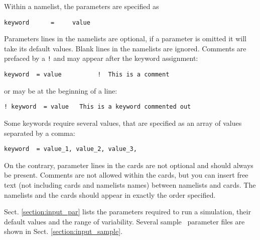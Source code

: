 Within a namelist, the parameters are specified as
\begin{verbatim}
keyword      =     value
\end{verbatim}
Parameters lines in the namelists are optional, if a parameter is omitted
it will take its default values.
Blank lines in the namelists are ignored. Comments are prefaced by
a {\tt !} and may appear after the keyword assignment:
\begin{verbatim}
keyword  = value          !  This is a comment
\end{verbatim}
or may be at the beginning of a line:
\begin{verbatim}
! keyword  = value   This is a keyword commented out
\end{verbatim}
Some keywords require several values, that are specified as an array of values
separated by a comma:
\begin{verbatim}
keyword  = value_1, value_2, value_3,
\end{verbatim}

On the contrary, parameter lines in the cards are not optional and
should always be present. Comments are not allowed within the cards,
but you can insert free text (not including cards and namelists 
names) between namelists and cards.
The namelists and the cards should appear in exactly the order
specified. 

Sect. \ref{section:input_par} lists the parameters required to run a 
simulation, their default values and the range of variability.
Several sample \PDAC\ parameter files are shown in Sect. 
\ref{section:input_sample}.\\

